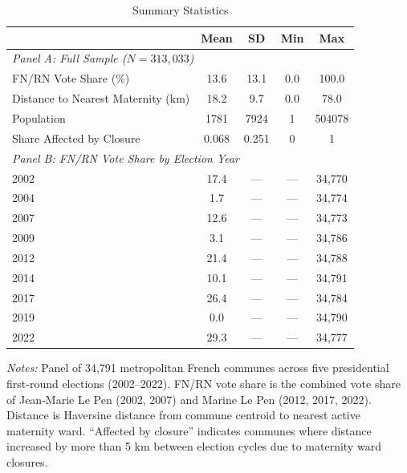 \begin{table}[htbp]
\centering
\caption{Summary Statistics}
\label{tab:summary}
\begin{tabular}{lcccc}
\toprule
 & Mean & SD & Min & Max \\
\midrule
\multicolumn{5}{l}{\textit{Panel A: Full Sample ($N = 313,033$)}} \\
FN/RN Vote Share (\%) & 13.6 & 13.1 & 0.0 & 100.0 \\
Distance to Nearest Maternity (km) & 18.2 & 9.7 & 0.0 & 78.0 \\
Population & 1781 & 7924 & 1 & 504078 \\
Share Affected by Closure & 0.068 & 0.251 & 0 & 1 \\
\midrule
\multicolumn{5}{l}{\textit{Panel B: FN/RN Vote Share by Election Year}} \\
2002 & 17.4 & --- & --- & 34,770 \\
2004 & 1.7 & --- & --- & 34,774 \\
2007 & 12.6 & --- & --- & 34,773 \\
2009 & 3.1 & --- & --- & 34,786 \\
2012 & 21.4 & --- & --- & 34,788 \\
2014 & 10.1 & --- & --- & 34,791 \\
2017 & 26.4 & --- & --- & 34,784 \\
2019 & 0.0 & --- & --- & 34,790 \\
2022 & 29.3 & --- & --- & 34,777 \\
\bottomrule
\end{tabular}
\begin{tablenotes}[flushleft]
\small
\item \textit{Notes:} Panel of 34,791 metropolitan French communes across five presidential first-round elections (2002--2022). FN/RN vote share is the combined vote share of Jean-Marie Le Pen (2002, 2007) and Marine Le Pen (2012, 2017, 2022). Distance is Haversine distance from commune centroid to nearest active maternity ward. ``Affected by closure'' indicates communes where distance increased by more than 5 km between election cycles due to maternity ward closures.
\end{tablenotes}
\end{table}

